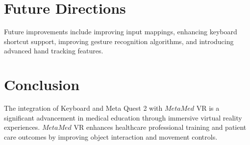 \section{Future Directions}
Future improvements include improving input mappings, enhancing keyboard shortcut support, improving gesture recognition algorithms, and introducing advanced hand tracking features.
\section{Conclusion}
The integration of Keyboard and Meta Quest 2 with $MetaMed$ VR is a significant advancement in medical education through immersive virtual reality experiences. $MetaMed$ VR enhances healthcare professional training and patient care outcomes by improving object interaction and movement controls.\\
